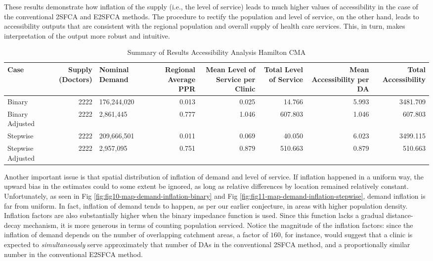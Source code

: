 \documentclass[10pt,letterpaper]{article}
\begin{document}
These results demonstrate how inflation of the supply (i.e., the level
of service) leads to much higher values of accessibility in the case of
the conventional 2SFCA and E2SFCA methods. The procedure to rectify the
population and level of service, on the other hand, leads to
accessibility outputs that are consistent with the regional population
and overall supply of health care services. This, in turn, makes
interpretation of the output more robust and intuitive.

\begin{landscape}\begin{table}[t]

\caption{\label{tab:table-descriptive-statistics}\label{tab:table-descriptive-statistics}Summary of Results Accessibility Analysis Hamilton CMA}
\centering
\fontsize{7}{9}\selectfont
\begin{tabular}{lrlrrrrr}
\toprule
Case & Supply (Doctors) & Nominal Demand & Regional Average PPR & Mean Level of Service per Clinic & Total Level of Service & Mean Accessibility per DA & Total Accessibility\\
\midrule
Binary & 2222 & 176,244,020 & 0.013 & 0.025 & 14.766 & 5.993 & 3481.709\\
Binary Adjusted & 2222 & 2,861,445 & 0.777 & 1.046 & 607.803 & 1.046 & 607.803\\
Stepwise & 2222 & 209,666,501 & 0.011 & 0.069 & 40.050 & 6.023 & 3499.115\\
Stepwise Adjusted & 2222 & 2,957,095 & 0.751 & 0.879 & 510.663 & 0.879 & 510.663\\
\bottomrule
\end{tabular}
\end{table}
\end{landscape}

Another important issue is that spatial distribution of inflation of
demand and level of service. If inflation happened in a uniform way, the
upward bias in the estimates could to some extent be ignored, as long as
relative differences by location remained relatively constant.
Unfortunately, as seen in Fig
\ref{fig:fig10-map-demand-inflation-binary} and Fig
\ref{fig:fig11-map-demand-inflation-stepwise}, demand inflation is far
from uniform. In fact, inflation of demand tends to happen, as per our
earlier conjecture, in areas with higher population density. Inflation
factors are also substantially higher when the binary impedance function
is used. Since this function lacks a gradual distance-decay mechanism,
it is more generous in terms of counting population serviced. Notice the
magnitude of the inflation factors: since the inflation of demand
depends on the number of overlapping catchment areas, a factor of
\(160\), for instance, would suggest that a clinic is expected to
\emph{simultaneously} serve approximately that number of DAs in the
conventional 2SFCA method, and a proportionally similar number in the
conventional E2SFCA method.
\end{document}
